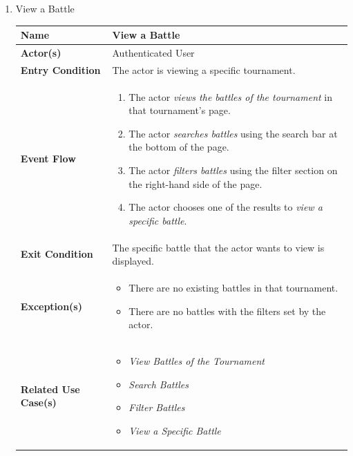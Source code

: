 \begin{enumerate}
\item View a Battle
    \begin{center}
    \begin{tabular}{ | m{10em} | m{10cm}| } 
      \hline
      \textbf{Name} & View a Battle  \\ 
      \hline
      \textbf{Actor(s)} & Authenticated User \\ 
      \hline
      \textbf{Entry Condition} & The actor is viewing a specific tournament. \\ 
      \hline
      \textbf{Event Flow} & 
          \begin{enumerate}[(1)]
              \item The actor \textit{views the battles of the tournament} in that tournament's page.
              \item The actor \textit{searches battles} using the search bar at the bottom of the page.
              \item The actor \textit{filters battles} using the filter section on the right-hand side of the page.
              \item The actor chooses one of the results to \textit{view a specific battle}.
          \end{enumerate}
      \\ 
      \hline
      \textbf{Exit Condition} & The specific battle that the actor wants to view is displayed.  \\ 
      \hline
      \textbf{Exception(s)} & 
      \begin{itemize}
          \item There are no existing battles in that tournament.
          \item There are no battles with the filters set by the actor.
      \end{itemize}
          \\ 
      \hline
      \textbf{Related Use Case(s)} & 
      \begin{itemize}
          \item \textit{View Battles of the Tournament}
          \item \textit{Search Battles}
          \item \textit{Filter Battles}
          \item \textit{View a Specific Battle}
      \end{itemize}
          \\ 
      \hline
    \end{tabular}
    \label{tbl:uc5}
\end{center}



\end{enumerate}
